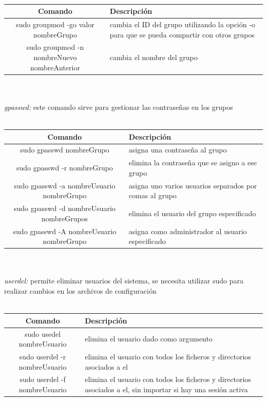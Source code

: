 \documentclass[10pt,a4paper,titlepage]{article}
\begin{document}
	\\
	\begin{tabular}{|c|p{6cm}|}
		\hline
		Comando & Descripción \\
		\hline
		sudo groupmod -go valor nombreGrupo & cambia el ID del grupo utilizando la opción -o para que se pueda compartir con otros grupos \\
		\hline
		sudo groupmod -n nombreNuevo nombreAnterior & cambia el nombre del grupo \\
		\hline
	\end{tabular}
	\\
	\\
	\emph{gpasswd:} este comando sirve para gestionar las contraseñas en los grupos
	\\
	\\
	\begin{tabular}{|c|p{6cm}|}
		\hline
		Comando & Descripción \\
		\hline
		sudo gpasswd nombreGrupo & asigna una contraseña al grupo \\
		\hline
		sudo gpasswd -r nombreGrupo & elimina la contraseña que se asigno a ese grupo \\
		\hline
		sudo gpasswd -a nombreUsuario nombreGrupo & asigna uno varios usuarios separados por comas al grupo \\
		\hline
		sudo gpasswd -d nombreUsuario nombreGrupos & elimina el usuario del grupo especificado \\
		\hline
		sudo gpasswd -A nombreUsuario nombreGrupo & asigna como administrador al usuario especificado \\
		\hline
	\end{tabular}
	\\
	\\
	\emph{userdel:} permite eliminar usuarios del sistema, se necesita utilizar sudo para realizar cambios en los archivos de configuración
	\\
	\\
	\begin{tabular}{|c|p{8cm}|}
		\hline
		Comando & Descripción \\
		\hline
		sudo usedel nombreUsuario & elimina el usuario dado como argumento \\
		\hline
		sudo userdel -r nombreUsuario & elimina el usuario con todos los ficheros y directorios asociados a el \\
		\hline
		sudo userdel -f nombreUsuario & elimina el usuario con todos los ficheros y directorios asociados a el, sin importar si hay una sesión activa \\
		\hline
	\end{tabular}
\end{document}

